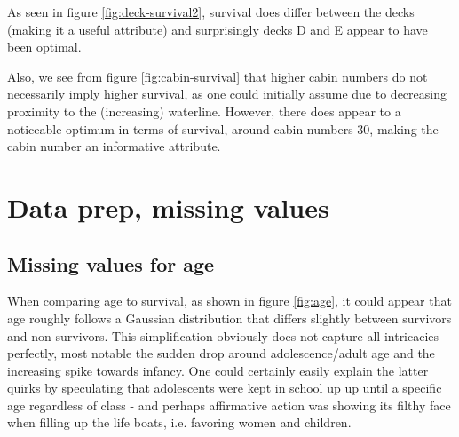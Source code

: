 \documentclass[11.5pt]{article}
\newcommand{\ti}[1] {\textit{#1}}
\begin{document}

As seen in figure \ref{fig:deck-survival2}, survival does differ between the decks (making it a useful attribute) and surprisingly decks D and E appear to have been optimal. 


Also, we see from figure \ref{fig:cabin-survival} that higher cabin numbers do not necessarily imply higher survival, as one could initially assume due to decreasing proximity to the (increasing) waterline. However, there does appear to a noticeable optimum in terms of survival, around cabin numbers 30, making the cabin number an informative attribute.




\section{Data prep, missing values}
 
 
 
 \subsection*{Missing values for age}

When comparing age to survival, as shown in figure \ref{fig:age}, it could appear that age roughly follows a Gaussian distribution that differs slightly between survivors and non-survivors. This simplification obviously does not capture all intricacies perfectly, most notable the sudden drop around adolescence/adult age and the increasing spike towards infancy. One could certainly easily explain the latter quirks by speculating that adolescents were kept in school up up until a specific age regardless of class - and perhaps affirmative action was showing its filthy face when filling up the life boats, i.e. favoring women and children.
\end{document}
